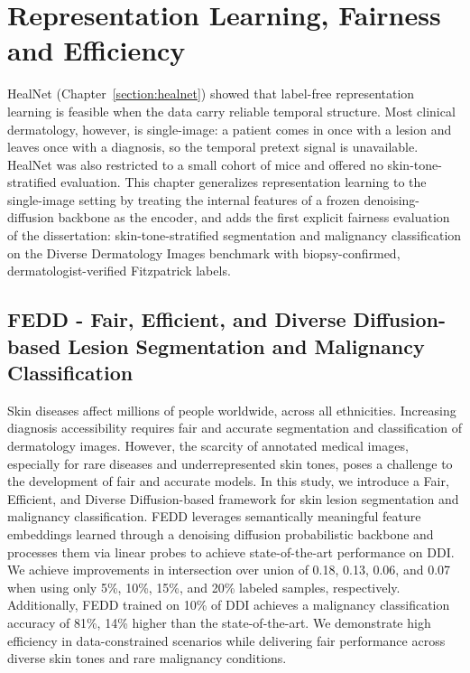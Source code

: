 \documentclass[11pt]{ucthesis}
\begin{document}
\chapter{Representation Learning, Fairness and Efficiency}\label{section:fedd}

HealNet (Chapter~\ref{section:healnet}) showed that label-free representation learning is feasible when the data carry reliable temporal structure. Most clinical dermatology, however, is single-image: a patient comes in once with a lesion and leaves once with a diagnosis, so the temporal pretext signal is unavailable. HealNet was also restricted to a small cohort of mice and offered no skin-tone-stratified evaluation. This chapter generalizes representation learning to the single-image setting by treating the internal features of a frozen denoising-diffusion backbone as the encoder, and adds the first explicit fairness evaluation of the dissertation: skin-tone-stratified segmentation and malignancy classification on the Diverse Dermatology Images benchmark with biopsy-confirmed, dermatologist-verified Fitzpatrick labels.

\section{FEDD - Fair, Efficient, and Diverse Diffusion-based Lesion Segmentation and Malignancy Classification}\label{section:fedd_abs}
Skin diseases affect millions of people worldwide, across all ethnicities. Increasing diagnosis accessibility requires fair and accurate segmentation and classification of dermatology images. However, the scarcity of annotated medical images, especially for rare diseases and underrepresented skin tones, poses a challenge to the development of fair and accurate models. In this study, we introduce a Fair, Efficient, and Diverse Diffusion-based framework for skin lesion segmentation and malignancy classification. FEDD leverages semantically meaningful feature embeddings learned through a denoising diffusion probabilistic backbone and processes them via linear probes to achieve state-of-the-art performance on DDI. We achieve improvements in intersection over union of 0.18, 0.13, 0.06, and 0.07 when using only 5\%, 10\%, 15\%, and 20\% labeled samples, respectively. Additionally, FEDD trained on 10\% of DDI achieves a malignancy classification accuracy of 81\%, 14\% higher than the state-of-the-art. We demonstrate high efficiency in data-constrained scenarios while delivering fair performance across diverse skin tones and rare malignancy conditions.
\end{document}
